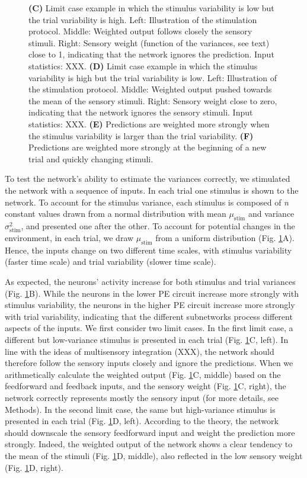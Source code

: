 \documentclass[10pt,a4paper]{article}
\begin{document}
\begin{figure}[t!]
{{\bf (C)} Limit case example in which the stimulus variability is low but the trial variability is high. Left: Illustration of the stimulation protocol. Middle: Weighted output follows closely the sensory stimuli. Right: Sensory weight (function of the variances, see text) close to 1, indicating that the network ignores the prediction. Input statistics: XXX.
{\bf (D)} Limit case example in which the stimulus variability is high but the trial variability is low. Left: Illustration of the stimulation protocol. Middle: Weighted output pushed towards the mean of the sensory stimuli. Right: Sensory weight close to zero, indicating that the network ignores the sensory stimuli. Input statistics: XXX.
{\bf (E)} Predictions are weighted more strongly when the stimulus variability is larger than the trial variability.
{\bf (F)} Predictions are weighted more strongly at the beginning of a new trial and quickly changing stimuli.
}
\label{fig:Fig_3}
\end{figure}
%

To test the network's ability to estimate the variances correctly, we stimulated the network with a sequence of inputs. In each trial one stimulus is shown to the network. To account for the stimulus variance, each stimulus is composed of \textit{n} constant values drawn from a normal distribution with mean $\mu_\mathrm{stim}$ and variance $\sigma_\mathrm{stim}^2$, and presented one after the other. To account for potential changes in the environment, in each trial, we draw $\mu_\mathrm{stim}$ from a uniform distribution (Fig. \ref{fig:Fig_3}A). Hence, the inputs change on two different time scales, with stimulus variability (faster time scale) and trial variability (slower time scale).

As expected, the neurons' activity increase for both stimulus and trial variances (Fig. \ref{fig:Fig_3}B). While the neurons in the lower PE circuit increase more strongly with stimulus variability, the neurons in the higher PE circuit increase more strongly with trial variability, indicating that the different subnetworks process different aspects of the inputs. We first consider two limit cases. In the first limit case, a different but low-variance stimulus is presented in each trial (Fig. \ref{fig:Fig_3}C, left). In line with the ideas of multisensory integration (XXX), the network should therefore follow the sensory inputs closely and ignore the predictions. When we arithmetically calculate the weighted output (Fig. \ref{fig:Fig_3}C, middle) based on the feedforward and feedback inputs, and the sensory weight (Fig. \ref{fig:Fig_3}C, right), the network correctly represents mostly the sensory input (for more details, see Methods). In the second limit case, the same but high-variance stimulus is presented in each trial (Fig. \ref{fig:Fig_3}D, left). According to the theory, the network should downscale the sensory feedforward input and weight the prediction more strongly. Indeed, the weighted output of the network shows a clear tendency to the mean of the stimuli (Fig. \ref{fig:Fig_3}D, middle), also reflected in the low sensory weight (Fig. \ref{fig:Fig_3}D, right). 
\end{document}
